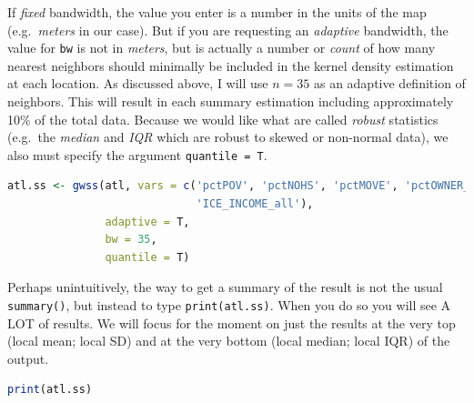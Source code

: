 \documentclass[
]{book}
\newcommand{\passthrough}[1]{#1}
\begin{document}
If \emph{fixed} bandwidth, the value you enter is a number in the units of the map (e.g.~\emph{meters} in our case). But if you are requesting an \emph{adaptive} bandwidth, the value for \passthrough{\lstinline!bw!} is not in \emph{meters}, but is actually a number or \emph{count} of how many nearest neighbors should minimally be included in the kernel density estimation at each location. As discussed above, I will use \(n=35\) as an adaptive definition of neighbors. This will result in each summary estimation including approximately 10\% of the total data. Because we would like what are called \emph{robust} statistics (e.g.~the \emph{median} and \emph{IQR} which are robust to skewed or non-normal data), we also must specify the argument \passthrough{\lstinline!quantile = T!}.

\begin{lstlisting}[language=R]
atl.ss <- gwss(atl, vars = c('pctPOV', 'pctNOHS', 'pctMOVE', 'pctOWNER_OCC',
                             'ICE_INCOME_all'),
               adaptive = T,
               bw = 35,
               quantile = T)
\end{lstlisting}

Perhaps unintuitively, the way to get a summary of the result is not the usual \passthrough{\lstinline!summary()!}, but instead to type \passthrough{\lstinline!print(atl.ss)!}. When you do so you will see A LOT of results. We will focus for the moment on just the results at the very top (local mean; local SD) and at the very bottom (local median; local IQR) of the output.

\begin{lstlisting}[language=R]
print(atl.ss)
\end{lstlisting}
\end{document}
